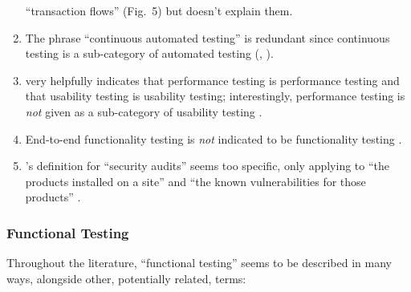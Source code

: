 \begin{enumerate}
            ``transaction flows'' (Fig.~5) but doesn't explain them.
      \item The phrase ``continuous automated testing''  \citep[p.~11]{Gerrard2000a}
            is redundant since continuous testing is a sub-category of automated
            testing (\citealp[p.~35]{IEEE2022}, \citealpISTQB{}).
      \item \citeauthor{Gerrard2000a} very helpfully indicates that performance
            testing is performance testing and that usability testing is
            usability testing; interestingly, performance testing is \emph{not}
            given as a sub-category of usability testing
            \citeyearpar[Tab.~2]{Gerrard2000a}.
      \item End-to-end functionality testing is \emph{not} indicated to be
            functionality testing \citep[Tab.~2]{Gerrard2000a}.
      \item \citeauthor{Gerrard2000b}'s definition for ``security audits''
            seems too specific, only applying to ``the products installed on a
            site'' and ``the known vulnerabilities for those products''
            \citeyearpar[p.~28]{Gerrard2000b}.
\end{enumerate}


\subsubsection{Functional Testing}

Throughout the literature, ``functional testing'' seems to be described in many
ways, alongside other, potentially related, terms:

